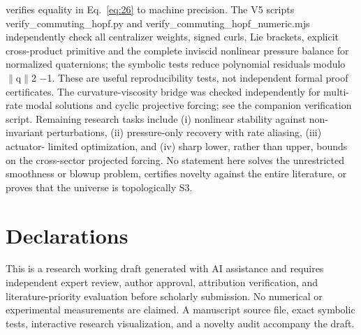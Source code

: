 \documentclass[10pt,letterpaper]{article}
\theoremstyle{remark}
\begin{document}
verifies equality in Eq.~\eqref{eq:26} to machine precision. The V5 scripts verify\_commuting\_hopf.py and verify\_commuting\_hopf\_numeric.mjs independently check all centralizer weights, signed curls, Lie brackets, explicit cross-product primitive and the complete inviscid nonlinear pressure balance for normalized quaternions; the symbolic tests reduce polynomial residuals modulo \(\| \)q\(\| \)2 \(- \)1. These are useful reproducibility tests, not independent formal proof certificates. The curvature-viscosity bridge was checked independently for multi-rate modal solutions and cyclic projective forcing; see the companion verification script. Remaining research tasks include (i) nonlinear stability against non-invariant perturbations, (ii) pressure-only recovery with rate aliasing, (iii) actuator- limited optimization, and (iv) sharp lower, rather than upper, bounds on the cross-sector projected forcing. No statement here solves the unrestricted smoothness or blowup problem, certifies novelty against the entire literature, or proves that the universe is topologically S3.


\section*{Declarations}

This is a research working draft generated with AI assistance and requires independent expert review, author approval, attribution verification, and literature-priority evaluation before scholarly submission. No numerical or experimental measurements are claimed. A manuscript source file, exact symbolic tests, interactive research visualization, and a novelty audit accompany the draft.
\end{document}
